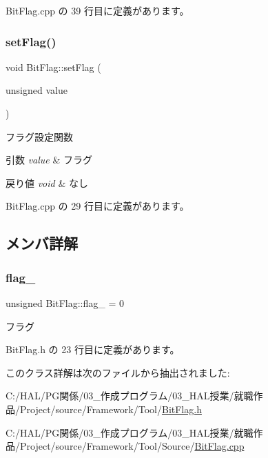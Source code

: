  Bit\+Flag.\+cpp の 39 行目に定義があります。

\mbox{\label{class_bit_flag_a3052dd5ee44269665e0ae3ddea4c1c28}} 
\subsubsection{\texorpdfstring{set\+Flag()}{setFlag()}}
{\footnotesize\ttfamily void Bit\+Flag\+::set\+Flag (\begin{DoxyParamCaption}\item[{unsigned}]{value }\end{DoxyParamCaption})}



フラグ設定関数 


\begin{DoxyParams}{引数}
{\em value} & フラグ \\
\hline
\end{DoxyParams}

\begin{DoxyRetVals}{戻り値}
{\em void} & なし \\
\hline
\end{DoxyRetVals}


 Bit\+Flag.\+cpp の 29 行目に定義があります。



\subsection{メンバ詳解}
\mbox{\label{class_bit_flag_a028f7ae93ca40f24eefaef58aad615bc}} 
\subsubsection{\texorpdfstring{flag\+\_\+}{flag\_}}
{\footnotesize\ttfamily unsigned Bit\+Flag\+::flag\+\_\+ = 0}



フラグ 



 Bit\+Flag.\+h の 23 行目に定義があります。



このクラス詳解は次のファイルから抽出されました\+:\begin{DoxyCompactItemize}
\item 
C\+:/\+H\+A\+L/\+P\+G関係/03\+\_\+作成プログラム/03\+\_\+\+H\+A\+L授業/就職作品/\+Project/source/\+Framework/\+Tool/\mbox{\hyperlink{_bit_flag_8h}{Bit\+Flag.\+h}}\item 
C\+:/\+H\+A\+L/\+P\+G関係/03\+\_\+作成プログラム/03\+\_\+\+H\+A\+L授業/就職作品/\+Project/source/\+Framework/\+Tool/\+Source/\mbox{\hyperlink{_bit_flag_8cpp}{Bit\+Flag.\+cpp}}\end{DoxyCompactItemize}
